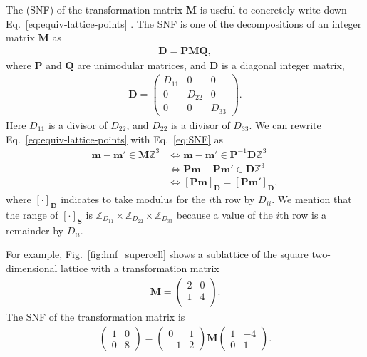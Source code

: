 The  (SNF) of the transformation matrix $\mathbf{M}$ is useful to concretely write down Eq.~\eqref{eq:equiv-lattice-points} \cite{PhysRevB.77.224115}.
The SNF is one of the decompositions of an integer matrix $\mathbf{M}$ as
\begin{align}
  \label{eq:SNF}
  \bm{D} = \bm{PMQ},
\end{align}
where $\bm{P}$ and $\bm{Q}$ are unimodular matrices, and $\mathbf{D}$ is a diagonal integer matrix,
\begin{align}
  \bm{D} =
      \begin{pmatrix}
          D_{11} & 0 & 0 \\
          0 & D_{22} & 0 \\
          0 & 0 & D_{33}
      \end{pmatrix}.
\end{align}
Here $D_{11}$ is a divisor of $D_{22}$, and $D_{22}$ is a divisor of $D_{33}$.
We can rewrite Eq.~\eqref{eq:equiv-lattice-points} with Eq.~\eqref{eq:SNF} as
\begin{align}
  \label{eq:equiv-represents}
  \bm{m} - \bm{m}' \in \bm{M} \mathbb{Z}^{3}
    &\Leftrightarrow \bm{m} - \bm{m}' \in \bm{P}^{-1} \bm{D} \mathbb{Z}^{3} \nonumber \\
    &\Leftrightarrow \bm{Pm} - \bm{Pm}' \in \bm{D} \mathbb{Z}^{3} \nonumber \\
    &\Leftrightarrow [\bm{Pm}]_{\bm{D}} = [\bm{Pm}']_{\bm{D}},
\end{align}
where $[\cdot]_{\bm{D}}$ indicates to take modulus for the $i$th row by $D_{ii}$.
We mention that the range of $[\cdot]_{\mathbf{S}}$ is $\mathbb{Z}_{D_{11}} \times \mathbb{Z}_{D_{22}} \times \mathbb{Z}_{D_{33}}$ because a value of the $i$th row is a remainder by $D_{ii}$.

For example, Fig.~\ref{fig:hnf_supercell} shows a sublattice of the square two-dimensional lattice with a transformation matrix
\begin{align*}
  \bm{M} =
  \begin{pmatrix}
    2 & 0 \\
    1 & 4 \\
  \end{pmatrix}.
\end{align*}
The SNF of the transformation matrix is
\begin{align*}
  \begin{pmatrix} 1 & 0 \\ 0 & 8 \end{pmatrix}
  =
  \begin{pmatrix} 0 & 1 \\ -1 & 2 \end{pmatrix}
  \bm{M}
  \begin{pmatrix} 1 & -4 \\ 0 & 1 \end{pmatrix}.
\end{align*}

